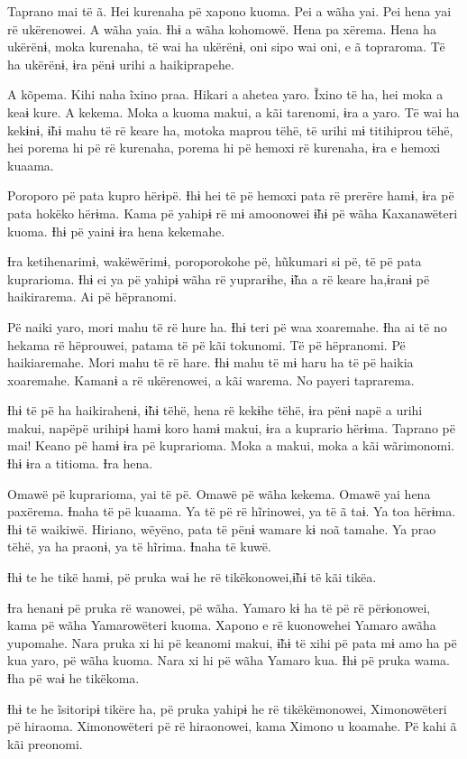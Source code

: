 Taprano mai të ã. Hei kurenaha pë xapono kuoma. Pei a wãha yai. Pei hena
yai rë ukërenowei. A wãha yaia. Ɨhɨ a wãha kohomowë. Hena pa xërema.
Hena ha ukërënɨ, moka kurenaha, të wai ha ukërënɨ, oni sipo wai oni, e ã
topraroma. Të ha ukërënɨ, ɨra pënɨ urihi a haikiprapehe. 

A kõpema. Kihi naha ĩxino praa. Hikari a ahetea yaro. Ĩxino të ha, hei
moka a keaɨ kure. A kekema. Moka a kuoma makui, a kãi tarenomi, ɨra a
yaro. Të wai ha kekɨnɨ, ɨ̃hɨ mahu të rë keare ha, motoka maprou tëhë, të
urihi mɨ titihiprou tëhë, hei porema hi pë rë kurenaha, porema hi pë
hemoxi rë kurenaha, ɨra e hemoxi kuaama. 

Poroporo pë pata kupro hërɨpë. Ɨhɨ hei të pë hemoxi pata rë prerëre
hamɨ, ɨra pë pata hokëko hërɨma. Kama pë yahipɨ rë mɨ amoonowei ɨ̃hɨ pë
wãha Kaxanawëteri kuoma. Ɨhɨ pë yainɨ ɨra hena kekemahe. 

Ɨra ketihenarimɨ, wakëwërimɨ, poroporokohe pë, hũkumari si pë, të pë
pata kuprarioma. Ɨhɨ ei ya pë yahipɨ wãha rë yuprarɨhe, ɨ̃ha a rë keare
ha,ɨranɨ pë haikirarema. Ai pë hëpranomi. 

Pë naiki yaro, mori mahu të rë hure ha. Ɨhɨ teri pë waa xoaremahe. Ɨha
ai të no hekama rë hëprouwei, patama të pë kãi tokunomi. Të pë
hëpranomi. Pë haikiaremahe. Mori mahu të rë hare. Ɨhɨ mahu të mɨ haru ha
të pë haikia xoaremahe. Kamanɨ a rë ukërenowei, a kãi warema. No payeri
taprarema. 

Ɨhɨ të pë ha haikirahenɨ, ɨ̃hɨ tëhë, hena rë kekɨhe tëhë, ɨra pënɨ napë a
urihi makui, napëpë urihipɨ hamɨ koro hamɨ makui, ɨra a kuprario hërɨma.
Taprano pë mai! Keano pë hamɨ ɨra pë kuprarioma. Moka a makui, moka a
kãi wãrimonomi. Ɨhɨ ɨra a titioma. Ɨra hena. 

Omawë pë kuprarioma, yai të pë. Omawë pë wãha kekema. Omawë yai hena
paxërema. Ɨnaha të pë kuaama. Ya të pë rë hĩrinowei, ya të ã taɨ. Ya toa
hërɨma. Ɨhɨ të waikiwë. Hiriano, wëyëno, pata të pënɨ wamare kɨ noã
tamahe. Ya prao tëhë, ya ha praonɨ, ya të hĩrima. Ɨnaha të kuwë. 

Ɨhɨ te he tikë hamɨ, pë pruka waɨ he rë tikëkonowei,ɨ̃hɨ të kãi tikëa. 

Ɨra henanɨ pë pruka rë wanowei, pë wãha. Yamaro kɨ ha të pë rë
përɨonowei, kama pë wãha Yamarowëteri kuoma. Xapono e rë kuonowehei
Yamaro awãha yupomahe. Nara pruka xi hi pë keanomi makui, ɨ̃hɨ të xihi pë
pata mɨ amo ha pë kua yaro, pë wãha kuoma. Nara xi hi pë wãha Yamaro
kua. Ɨhɨ pë pruka wama. Ɨha pë waɨ he tikëkoma. 

Ɨhɨ te he ĩsitoripɨ tikëre ha, pë pruka yahipɨ he rë tikëkëmonowei,
Ximonowëteri pë hiraoma. Ximonowëteri pë rë hiraonowei, kama Ximono u
koamahe. Pë kahi ã kãi preonomi. 

